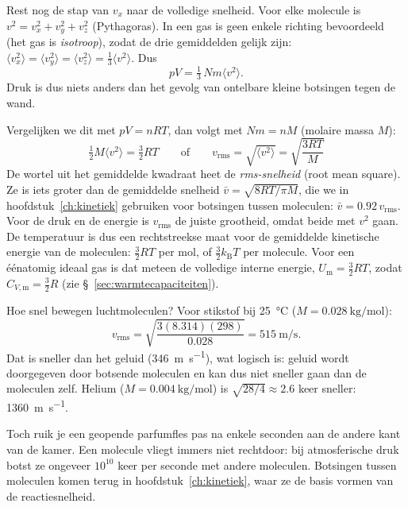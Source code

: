 Rest nog de stap van $v_x$ naar de volledige snelheid. Voor elke molecule is $v^2 = v_x^2 + v_y^2 + v_z^2$ (Pythagoras). In een gas is geen enkele richting bevoordeeld (het gas is \emph{isotroop}), zodat de drie gemiddelden gelijk zijn: $\langle v_x^2\rangle = \langle v_y^2\rangle = \langle v_z^2\rangle = \tfrac{1}{3}\langle v^2\rangle$. Dus
\begin{equation}
pV = \tfrac{1}{3}\,N m \langle v^2\rangle .
\label{eq:kmt-druk}
\end{equation}
Druk is dus niets anders dan het gevolg van ontelbare kleine botsingen tegen de wand.

Vergelijken we dit met $pV = nRT$, dan volgt met $Nm = nM$ (molaire massa $M$):
\begin{equation}
\boxed{\tfrac{1}{2}M\langle v^2\rangle = \tfrac{3}{2}RT}
\qquad\text{of}\qquad
\boxed{v_\mathrm{rms} = \sqrt{\langle v^2\rangle} = \sqrt{\frac{3RT}{M}}}
\label{eq:vrms}
\end{equation}
De wortel uit het gemiddelde kwadraat heet de \emph{rms-snelheid} (root mean square). Ze is iets groter dan de gemiddelde snelheid $\bar v = \sqrt{8RT/\pi M}$, die we in hoofdstuk~\ref{ch:kinetiek} gebruiken voor botsingen tussen moleculen: $\bar v = 0.92\,v_\mathrm{rms}$. Voor de druk en de energie is $v_\mathrm{rms}$ de juiste grootheid, omdat beide met $v^2$ gaan. De temperatuur is dus een rechtstreekse maat voor de gemiddelde kinetische energie van de moleculen: $\tfrac{3}{2}RT$ per mol, of $\tfrac{3}{2}k_\mathrm{B}T$ per molecule. Voor een \'e\'enatomig ideaal gas is dat meteen de volledige interne energie, $U_\mathrm{m} = \tfrac{3}{2}RT$, zodat $C_{V,\mathrm{m}} = \tfrac{3}{2}R$ (zie \S~\ref{sec:warmtecapaciteiten}).

\begin{voorbeeld}{Hoe snel bewegen luchtmoleculen?}
Voor stikstof bij \SI{25}{\celsius} ($M = \SI{0.028}{\kilo\gram\per\mole}$):
\[
v_\mathrm{rms} = \sqrt{\frac{3(8.314)(298)}{0.028}} = \SI{515}{\metre\per\second}.
\]
Dat is sneller dan het geluid (\SI{346}{\metre\per\second}), wat logisch is: geluid wordt doorgegeven door botsende moleculen en kan dus niet sneller gaan dan de moleculen zelf. Helium ($M = \SI{0.004}{\kilo\gram\per\mole}$) is $\sqrt{28/4}\approx 2.6$ keer sneller: \SI{1360}{\metre\per\second}.

Toch ruik je een geopende parfumfles pas na enkele seconden aan de andere kant van de kamer. Een molecule vliegt immers niet rechtdoor: bij atmosferische druk botst ze ongeveer $10^{10}$ keer per seconde met andere moleculen. Botsingen tussen moleculen komen terug in hoofdstuk~\ref{ch:kinetiek}, waar ze de basis vormen van de reactiesnelheid.
\end{voorbeeld}

